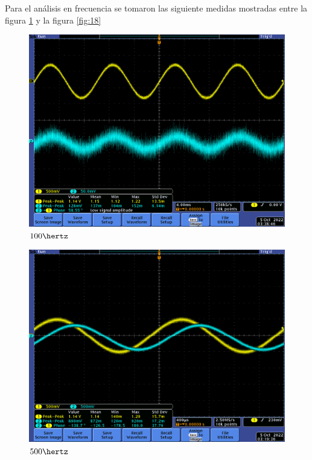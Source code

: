 \documentclass[12pt,letterpaper]{article}     %
\begin{document}
{Para el análisis en frecuencia se tomaron las siguiente medidas mostradas entre la figura \ref{fig:23}
y la figura \ref{fig:18}

\begin{figure}[!ht]
\centering
\includegraphics[scale=0.5]{imagenes/23.png}
\caption{$100\hertz$}
\label{fig:23}
\end{figure}

\begin{figure}[!ht]
\centering
\includegraphics[scale=0.5]{imagenes/13.png}
\caption{$500\hertz$}
\label{fig:13}
\end{figure}

}
\end{document}

